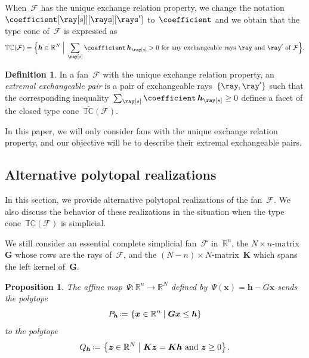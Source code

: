 \documentclass{amsart}
\newtheorem{proposition}[theorem]{Proposition}
\theoremstyle{definition}
\newtheorem{definition}[theorem]{Definition}
\newcommand{\R}{\mathbb{R}} %
\renewcommand{\b}[1]{{\boldsymbol{#1}}} %
\newcommand{\set}[2]{\left\{ #1 \;\middle|\; #2 \right\}} %
\newcommand{\Bigset}[2]{\Big\{ #1 \;\Big|\; #2 \Big\}} %
\newcommand{\eqdef}{\mbox{\,\raisebox{0.2ex}{\scriptsize\ensuremath{\mathrm:}}\ensuremath{=}\,}} %
\newcommand{\darkblue}{\color{darkblue}} %
\newcommand{\defn}[1]{\textsl{\darkblue #1}} %
\newcommand{\Fan}{\mathcal{F}} %
\newcommand{\typeCone}{\mathbb{TC}} %
\newcommand{\ctypeCone}{\overline{\mathbb{TC}}} %
\begin{document}
When~$\Fan$ has the unique exchange relation property, we change the notation~$\coefficient[{\ray[s]}][\rays][\rays']$ to~$\coefficient$ and we obtain that the type cone of~$\Fan$ is expressed as
\[
\typeCone(\Fan) = \Bigset{\b{h} \in \R^N}{\sum_{\ray[s]} \coefficient \, \b{h}_{\ray[s]} > 0 \text{ for any exchangeable rays~$\ray$ and~$\ray'$ of~$\Fan$}}.
\]

\begin{definition}
In a fan~$\Fan$ with the unique exchange relation property, an \defn{extremal exchangeable pair} is a pair of exchangeable rays~$\{\ray,\ray'\}$ such that the corresponding inequality~${\sum_{\ray[s]} \coefficient \, \b{h}_{\ray[s]} \geq  0}$ defines a facet of the closed type cone~$\ctypeCone(\Fan)$.
\end{definition}

In this paper, we will only consider fans with the unique exchange relation property, and our objective will be to describe their extremal exchangeable pairs.


\subsection{Alternative polytopal realizations}

In this section, we provide alternative polytopal realizations of the fan~$\Fan$.
We also discuss the behavior of these realizations in the situation when the type cone~$\typeCone(\Fan)$ is simplicial.

We still consider an essential complete simplicial fan~$\Fan$ in~$\R^n$, the $N \times n$-matrix~$\b{G}$ whose rows are the rays of~$\Fan$, and the $(N-n) \times N$-matrix~$\b{K}$ which spans the left kernel of~$\b{G}$.

\begin{proposition}
\label{prop:alternativePolytopalRealization}
The affine map~$\Psi: \R^n \to \R^N$ defined by~$\Psi(\b{x}) = \b{h} - G\b{x}$ sends the polytope
\[
P_\b{h} \eqdef \set{\b{x} \in \R^n}{\b{G}\b{x} \le \b{h}}
\]
to the polytope
\[
Q_\b{h} \eqdef \set{\b{z} \in \R^N}{\b{K}\b{z} = \b{K}\b{h} \text{ and } \b{z} \ge 0}.
\]
\end{proposition}
\end{document}
